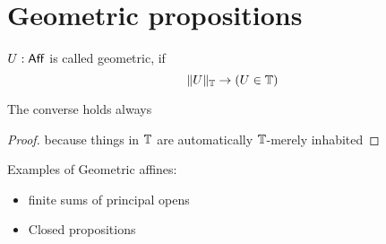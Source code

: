 
\section{Geometric propositions}
\begin{definition}
	$U : \mathsf{Aff}$ is called geometric, if 
	\[\|U\|_{\mathbb{T}} \to (U \in \mathbb{T})\]	
\end{definition}
\begin{lemma}{\label{lemma:geometricEquiv}}
	The converse holds always
\end{lemma}
\begin{proof}
	because things in $\mathbb{T}$ are automatically $\mathbb{T}$-merely inhabited
\end{proof}
\begin{example}
	Examples of Geometric affines:
		\begin{itemize}
		\item finite sums of principal opens
		\item Closed propositions
	\end{itemize}
	
\end{example}

